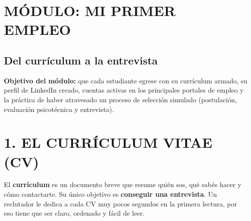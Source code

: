 \clearpage
\section*{MÓDULO: MI PRIMER EMPLEO}
\subsection*{Del currículum a la entrevista}

\begin{recuadro}
\textbf{Objetivo del módulo:} que cada estudiante egrese con su currículum armado, su perfil
de LinkedIn creado, cuentas activas en los principales portales de empleo y la práctica de
haber atravesado un proceso de selección simulado (postulación, evaluación psicotécnica y
entrevista).
\end{recuadro}

\section*{1. EL CURRÍCULUM VITAE (CV)}

El \textbf{currículum} es un documento breve que resume quién sos, qué sabés hacer y cómo
contactarte. Su único objetivo es \textbf{conseguir una entrevista}. Un reclutador le dedica a
cada CV muy pocos segundos en la primera lectura, por eso tiene que ser claro, ordenado y
fácil de leer.


